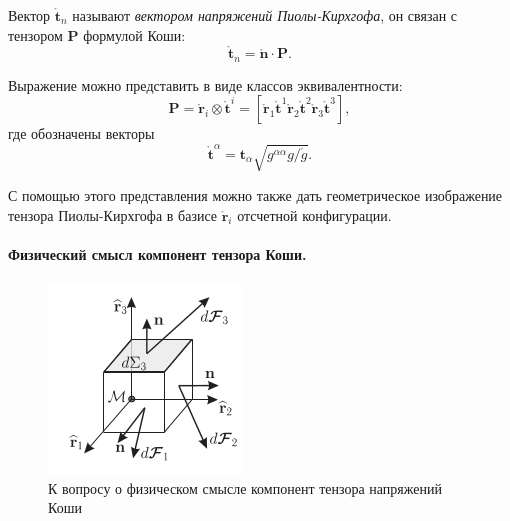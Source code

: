 Вектор $\mathring{\mathbf{t}}_n$ называют \textit{вектором напряжений Пиолы-Кирхгофа}, он связан с тензором $\mathbf{P}$ формулой Коши:
\begin{equation*}
	\mathring{\mathbf{t}}_n = \mathring{\mathbf{n}} \cdot \mathbf{P}.
\end{equation*}

Выражение можно представить в виде классов эквивалентности:
\begin{equation*}
	\mathbf{P} = \mathring{\mathbf{r}}_i \otimes \mathring{\mathbf{t}}^i = \left[\mathring{\mathbf{r}}_1 \mathring{\mathbf{t}}^1 \mathring{\mathbf{r}}_2 \mathring{\mathbf{t}}^2 \mathring{\mathbf{r}}_3 \mathring{\mathbf{t}}^3\right], 
\end{equation*}
где обозначены векторы
\begin{equation*}
	\mathring{\mathbf{t}}^{\alpha} = \mathbf{t}_{\alpha} \sqrt{g^{\alpha \alpha} g / \mathring{g}}.
\end{equation*}

С помощью этого представления можно также дать геометрическое изображение тензора Пиолы-Кирхгофа в базисе $\mathring{\mathbf{r}}_i$ отсчетной конфигурации.

\paragraph{Физический смысл компонент тензора Коши.}


\begin{figure}
	\centering
	\includegraphics[width=0.7\linewidth]{img/que18_2}
	\caption{К вопросу о физическом смысле компонент тензора напряжений Коши}
	\label{fig:que18_2}
\end{figure}

